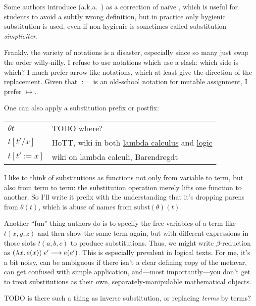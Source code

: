 \documentclass[11pt]{article} %
\theoremstyle{definition}
\theoremstyle{remark}
\begin{document}
Some authors introduce  (a.k.a.\ ) as a correction of na\"ive , which is useful for students to avoid a subtly wrong definition, but in practice only hygienic substitution is used, even if non-hygienic is sometimes called substitution \textit{simpliciter}.

Frankly, the variety of notations is a disaster, especially since so many just swap the order willy-nilly.
I refuse to use notations which use a slash: which side is which?
I much prefer arrow-like notations, which at least give the direction of the replacement.
Given that $:=$ is an old-school notation for mutable assignment, I prefer $\mapsto$.

One can also apply a substitution prefix or postfix:
\begin{center}
\renewcommand{\arraystretch}{1.2}
\begin{tabular}{lp{10cm}}
$\theta t$ & TODO where? \\
$t[t'/x]$ & HoTT, wiki in both \href{https://en.wikipedia.org/wiki/Lambda_calculus}{lambda calculus} and \href{https://en.wikipedia.org/wiki/Substitution_(logic)}{logic} \\
$t[t':=x]$ & wiki on lambda calculi, Barendregdt \\
\end{tabular}
\end{center}

I like to think of substitutions as functions not only from variable to term, but also from term to term: the substitution operation merely lifts one function to another. So I'll write it prefix with the understanding that it's dropping parens from $\theta(t)$, which is abuse of names from $\mathrm{subst}(\theta)(t)$.

Another ``fun'' thing authors do is to specify the free variables of a term like $t(x, y, z)$ and then show the same term again, but with different expressions in those slots $t(a, b, c)$ to produce substitutions.
Thus, we might write $\beta$-reduction as $({\lambda}{x}.\,e(x))\;e' \longrightarrow e(e')$.
This is especially prevalent in logical texts.
For me, it's a bit noisy, can be ambiguous if there isn't a clear defining copy of the metavar, can get confused with simple application, and---most importantly---you don't get to treat substitutions as their own, separately-manipulable mathematical objects.

TODO is there such a thing as inverse substitution, or replacing \emph{terms} by terms?
\end{document}
